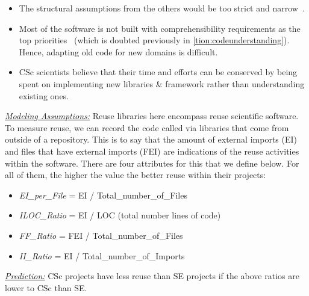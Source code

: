\documentclass[conference,10pt]{IEEEtran}
\newcommand{\bi}{\begin{itemize}}
\newcommand{\ei}{\end{itemize}}
\begin{document}
\bi
\item The structural assumptions from the others would be too strict and narrow~\cite{carver06_hpc, basili08_hpc}.
\item Most of the software is not built with comprehensibility requirements as the top priorities~\cite{segal_enduser} (which is doubted previously in \ref{tion:codeunderstanding}). Hence, adapting old code for new domains is difficult. 
\item
CSc scientists believe that their time and efforts can be conserved by being spent on implementing new libraries \& framework rather than understanding existing ones.
\ei
\noindent \textit{\underline{Modeling Assumptions:}} Reuse libraries here encompass reuse scientific software. To
measure reuse, we can record the code called
via libraries that come from outside of a repository. This is to say that the amount of external imports (EI) and files that have external imports (FEI) are indications of the reuse activities within the software. There are four attributes for this that we define below. For all of them, the higher the value the better reuse within their projects: 

\bi
\item \textit{EI\_per\_File} = EI / Total\_number\_of\_Files
\item \textit{ILOC\_Ratio} = EI / LOC (total number lines of code)
\item \textit{FF\_Ratio} = FEI / Total\_number\_of\_Files
\item \textit{II\_Ratio} = EI / Total\_number\_of\_Imports 
\ei


\noindent\textit{\underline{Prediction:}} CSc projects have
less reuse than SE projects if the above ratios
are lower to CSc than SE. 
\end{document}
